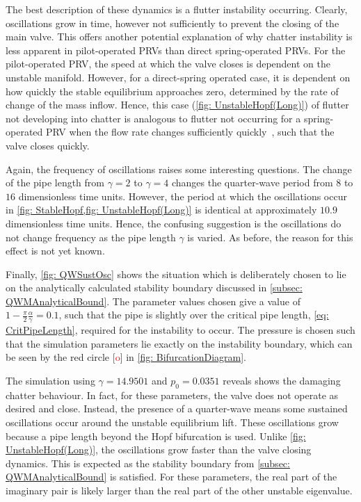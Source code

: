 \newpage
The best description of these dynamics is a flutter instability occurring. Clearly, oscillations grow in time, however not sufficiently to prevent the closing of the main valve. This offers another potential explanation of why chatter instability is less apparent in pilot-operated PRVs than direct spring-operated PRVs.
For the pilot-operated PRV, the speed at which the valve closes is dependent on the unstable manifold. However, for a direct-spring operated case, it is dependent on how quickly the stable equilibrium approaches zero, determined by the rate of change of the mass inflow.
Hence, this case (\cref{fig: UnstableHopf(Long)}) of flutter not developing into chatter is analogous to flutter not occurring for a spring-operated PRV when the flow rate changes sufficiently quickly~\cite{Hos2017DynamicRecommendations}, such that the valve closes quickly.

Again, the frequency of oscillations raises some interesting questions. The change of the pipe length from $\gamma = 2$ to $\gamma = 4$ changes the quarter-wave period from $8$ to $16$ dimensionless time units. However, the period at which the oscillations occur in \cref{fig: StableHopf,fig: UnstableHopf(Long)} is identical at approximately $10.9$ dimensionless time units. Hence, the confusing suggestion is the oscillations do not change frequency as the pipe length $\gamma$ is varied. As before, the reason for this effect is not yet known.

Finally, \cref{fig: QWSustOsc} shows the situation which is deliberately chosen to lie on the analytically calculated stability boundary discussed in \cref{subsec: QWMAnalyticalBound}. The parameter values chosen give a value of $1 - \frac{\pi}{2} \frac{\alpha}{\gamma} = 0.1$, such that the pipe is slightly over the critical pipe length, \cref{eq: CritPipeLength}, required for the instability to occur. The pressure is chosen such that the simulation parameters lie exactly on the instability boundary, which can be seen by the red circle [\textcolor{Red}{o}] in \cref{fig: BifurcationDiagram}.
~


The simulation using $\gamma = 14.9501$ and $p_0 = 0.0351$ reveals shows the damaging chatter behaviour. In fact, for these parameters, the valve does not operate as desired and close. Instead, the presence of a quarter-wave means some sustained oscillations occur around the unstable equilibrium lift. These oscillations grow because a pipe length beyond the Hopf bifurcation is used. Unlike \cref{fig: UnstableHopf(Long)}, the oscillations grow faster than the valve closing dynamics. This is expected as the stability boundary from \cref{subsec: QWMAnalyticalBound} is satisfied. For these parameters, the real part of the imaginary pair is likely larger than the real part of the other unstable eigenvalue.

